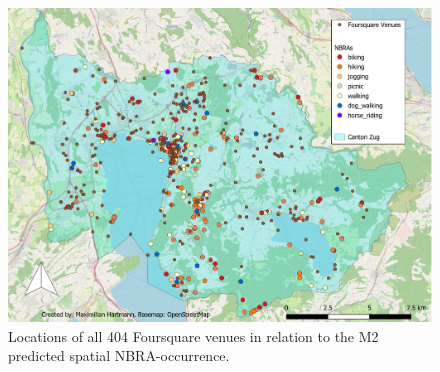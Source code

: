 \begin{figure}[h!]
   \centering
   \includegraphics[width=\textwidth,height=\textheight,keepaspectratio]{img/foursquare_compare_cropped.pdf}
   \caption{Locations of all 404 Foursquare venues in relation to the M2 predicted spatial NBRA-occurrence.}
   \label{fig:map_foursquare_comparison}
\end{figure}


